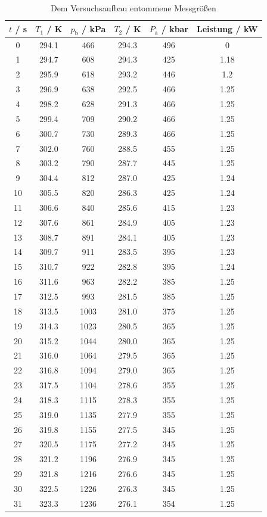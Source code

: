 \begin{table}
  \centering
  \begin{tabular}{c c c c c c}
    \toprule
    $t$ / s & $T_{\text{1}}$ / K & $p_{\text{b}}$ / kPa & $T_{2}$ / K & $P_{\text{a}}$ / kbar & Leistung / kW \\
    \midrule
    0 	& 294.1 & 466	& 294.3	& 496	& 0	\\
    1 	& 294.7 & 608	& 294.3	& 425	& 1.18	\\
    2 	& 295.9 & 618	& 293.2	& 446	& 1.2	\\
    3 	& 296.9 & 638	& 292.5	& 466	& 1.25	\\
    4	& 298.2	& 628	& 291.3	& 466	& 1.25	\\
    5	& 299.4 & 709	& 290.2	& 466	& 1.25	\\
    6	& 300.7 & 730	& 289.3	& 466	& 1.25	\\
    7	& 302.0 & 760	& 288.5	& 455	& 1.25	\\
    8	& 303.2	& 790	& 287.7	& 445	& 1.25	\\
    9	& 304.4 & 812	& 287.0	& 425	& 1.24	\\
    10	& 305.5 & 820	& 286.3	& 425	& 1.24	\\
    11 	& 306.6 & 840	& 285.6	& 415	& 1.23	\\
    12	& 307.6	& 861	& 284.9	& 405	& 1.23	\\	
    13	& 308.7 & 891	& 284.1	& 405	& 1.23	\\	
    14 	& 309.7 & 911	& 283.5	& 395	& 1.23	\\
    15 	& 310.7 & 922	& 282.8	& 395	& 1.24	\\
    16 	& 311.6	& 963	& 282.2	& 385	& 1.25	\\
    17	& 312.5	& 993	& 281.5	& 385	& 1.25	\\
    18	& 313.5	& 1003	& 281.0	& 375	& 1.25	\\
    19	& 314.3	& 1023	& 280.5	& 365	& 1.25	\\
    20	& 315.2	& 1044	& 280.0	& 365	& 1.25	\\
    21	& 316.0	& 1064	& 279.5	& 365	& 1.25	\\
    22	& 316.8	& 1094	& 279.0	& 365	& 1.25	\\
    23	& 317.5	& 1104	& 278.6	& 355	& 1.25	\\
    24	& 318.3	& 1115	& 278.3	& 355	& 1.25	\\
    25	& 319.0	& 1135	& 277.9	& 355	& 1.25	\\
    26	& 319.8	& 1155	& 277.5	& 345	& 1.25	\\
    27	& 320.5	& 1175	& 277.2	& 345	& 1.25	\\
    28	& 321.2	& 1196	& 276.9	& 345	& 1.25	\\
    29	& 321.8	& 1216	& 276.6	& 345	& 1.25	\\
    30	& 322.5	& 1226	& 276.3	& 345	& 1.25	\\
    31	& 323.3	& 1236	& 276.1	& 354	& 1.25	\\
  \end{tabular}
  \caption{Dem Versuchsaufbau entommene Messgrößen}
  \label{tab:Daten}
\end{table}

